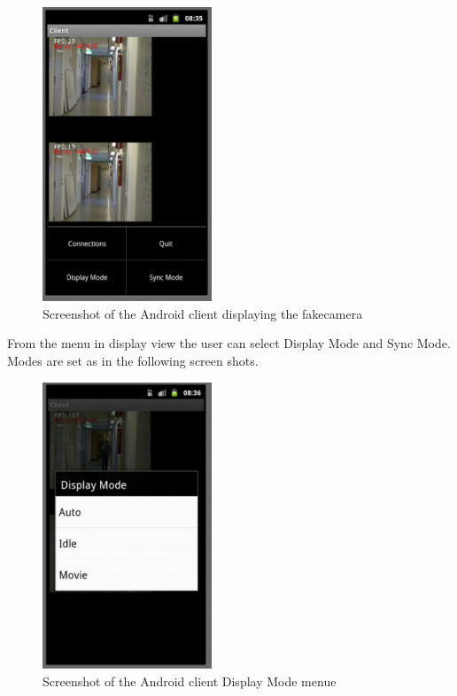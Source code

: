 \documentclass[8pt,titlepage]{article}
\begin{document}
\begin{figure}[hbp]
\centering
\includegraphics[width=0.45\textwidth]{../screenshots/androidDisplaying.png}
\caption{Screenshot of the Android client displaying the fakecamera}
\end{figure}

From the menu in display view the user can select Display Mode and Sync Mode. Modes are set as in the following screen shots.

\begin{figure}[hbp]
\centering
\includegraphics[width=0.45\textwidth]{../screenshots/androidDisplayMode.png}
\caption{Screenshot of the Android client Display Mode menue}
\end{figure}
\end{document}
